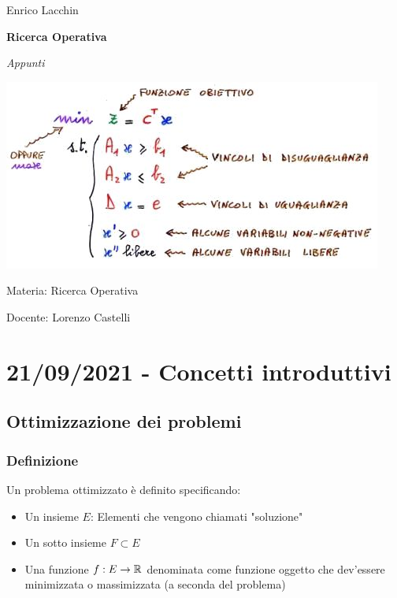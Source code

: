 \documentclass[12pt,a4paper]{article}
\begin{document}

\small{Enrico Lacchin}

\MidSep
\textbf{\LARGE{Ricerca Operativa}}

\MidSep
\textit{\Large{Appunti}}
\Sep

\begin{center}
\includegraphics[width=1\columnwidth]{img/ricerca_operativa.jpg}
\end{center}

\vfill
Materia: Ricerca Operativa

Docente: Lorenzo Castelli


\clearpage
\tableofcontents

\clearpage
\section{21/09/2021 - Concetti introduttivi}
\subsection{Ottimizzazione dei problemi}
\subsubsection{Definizione}
Un problema ottimizzato è definito specificando:
\begin{itemize}
\item Un insieme $E$: Elementi che vengono chiamati "soluzione"\\
\item Un sotto insieme $F\subset E$ 
\item Una funzione $f: E \rightarrow \mathbb{R}$ denominata come funzione oggetto che dev'essere minimizzata o massimizzata (a seconda del problema)
\end{itemize}
\end{document}
